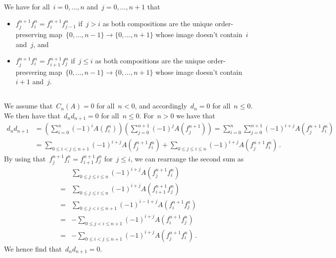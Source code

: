 \section{}

We have for all~$i = 0, \dotsc, n$ and~$j = 0, \dotsc, n+1$ that
\begin{itemize}
  \item
    $f^{n+1}_j f^n_i = f^{n+1}_i f^n_{j-1}$ if~$j > i$ as both compositions are the unique order-preserving map~$\{0, \dotsc, n-1\} \to \{0, \dotsc, n+1\}$ whose image doesn’t contain~$i$ and~$j$, and
  \item
    $f^{n+1}_j f^n_i = f^{n+1}_{i+1} f^n_j$ if~$j \leq i$ as both compositions are the unique order-presvering map~$\{0, \dotsc, n-1\} \to \{0, \dotsc, n+1\}$ whose image doesn’t contain~$i+1$ and~$j$.
\end{itemize}





\subsection{}

We assume that~$C_n(A) = 0$ for all~$n < 0$, and accordingly~$d_n = 0$ for all~$n \leq 0$.
We then have that~$d_n d_{n+1} = 0$ for all~$n \leq 0$.
For~$n > 0$ we have that
\begin{align*}
      d_n d_{n+1}
  &=  \left( \sum_{i=0}^n (-1)^i A(f^n_i) \right)
      \left( \sum_{j=0}^{n+1} (-1)^j A(f^{n+1}_j) \right)
   =  \sum_{i=0}^n \sum_{j=0}^{n+1} (-1)^{i+j} A(f^{n+1}_j f^n_i) \\
  &=    \sum_{0 \leq i < j \leq n+1} (-1)^{i+j} A(f^{n+1}_j f^n_i)
      + \sum_{0 \leq j \leq i \leq n} (-1)^{i+j} A(f^{n+1}_j f^n_i) \,.
\end{align*}
By using that~$f^{n+1}_j f^n_i = f^{n+1}_{i+1} f^n_j$ for~$j \leq i$, we can rearrange the second sum as
\begin{align*}
   {}&  \sum_{0 \leq j \leq i \leq n} (-1)^{i+j} A(f^{n+1}_j f^n_i) \\
  ={}&  \sum_{0 \leq j \leq i \leq n} (-1)^{i+j} A(f^{n+1}_{i+1} f^n_j) \\
  ={}&  \sum_{0 \leq j < i \leq n+1} (-1)^{i-1+j} A(f^{n+1}_i f^n_j) \\
  ={}&  -\sum_{0 \leq j < i \leq n+1} (-1)^{i+j} A(f^{n+1}_i f^n_j)  \\
  ={}&  -\sum_{0 \leq i < j \leq n+1} (-1)^{i+j} A(f^{n+1}_j f^n_i) \,.
\end{align*}
We hence find that~$d_n d_{n+1} = 0$.





